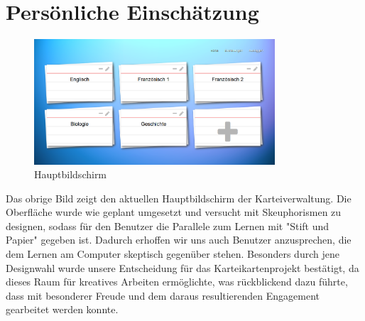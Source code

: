 \documentclass{article}
\begin{document}
\section{Persönliche Einschätzung}

\begin{figure}[H]
    \centering
    \includegraphics[width=0.8\textwidth]{images/overview.png}
    \caption{Hauptbildschirm}
    \label{fig:dashboard}
\end{figure}

Das obrige Bild zeigt den aktuellen Hauptbildschirm der Karteiverwaltung. Die Oberfläche wurde wie geplant umgesetzt und versucht mit Skeuphorismen zu designen, sodass für den Benutzer die Parallele zum Lernen mit "Stift und Papier" gegeben ist. Dadurch erhoffen wir uns auch Benutzer anzusprechen, die dem Lernen am Computer skeptisch gegenüber stehen. Besonders durch jene Designwahl wurde unsere Entscheidung für das Karteikartenprojekt bestätigt, da dieses Raum für kreatives Arbeiten ermöglichte, was rückblickend dazu führte, dass mit besonderer Freude und dem daraus resultierenden Engagement gearbeitet werden konnte.
\end{document}
